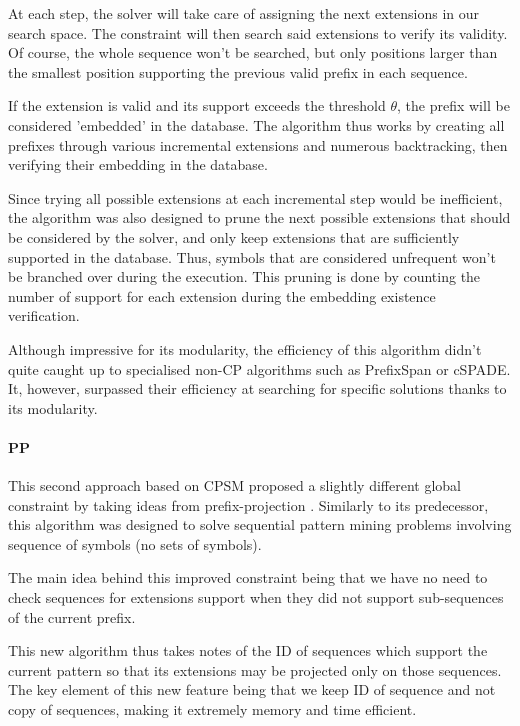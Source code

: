 \documentclass{eplmastersthesis}
\begin{document}
At each step, the solver will take care of assigning the next extensions in our search space. The constraint will then search said extensions to verify its validity. Of course, the whole sequence won't be searched, but only positions larger than the smallest position supporting the previous valid prefix in each sequence. \newline

If the extension is valid and its support exceeds the threshold $\theta$, the prefix will be considered 'embedded' in the database. The algorithm thus works by creating all prefixes through various incremental extensions and numerous backtracking, then verifying their embedding in the database. \newline

Since trying all possible extensions at each incremental step would be inefficient, the algorithm was also designed to prune the next possible extensions that should be considered by the solver, and only keep extensions that are sufficiently supported in the database. Thus, symbols that are considered unfrequent won't be branched over during the execution. This pruning is done by counting the number of support for each extension during the embedding existence verification. \newline

Although impressive for its modularity, the efficiency of this algorithm didn't quite caught up to specialised non-CP algorithms such as PrefixSpan or cSPADE. It, however, surpassed their efficiency at searching for specific solutions thanks to its modularity.

\paragraph{PP}

This second approach based on CPSM proposed a slightly different global constraint by taking ideas from prefix-projection \cite{kemmar2015prefix}. Similarly to its predecessor, this algorithm was designed to solve sequential pattern mining problems involving sequence of symbols (no sets of symbols).\newline

The main idea behind this improved constraint being that we have no need to check sequences for extensions support when they did not support sub-sequences of the current prefix. \newline

This new algorithm thus takes notes of the ID of sequences which support the current pattern so that its extensions may be projected only on those sequences. The key element of this new feature being that we keep ID of sequence and not copy of sequences, making it extremely memory and time efficient. \newline
\end{document}
